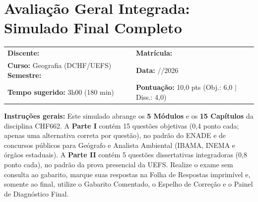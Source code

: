\clearpage
{}
{}
\chapter*{Avaliação Geral Integrada: Simulado Final Completo}

\begin{tcolorbox}[
  breakable, enhanced,
  colback=bgSoft, colframe=uefsNavy,
  borderline west={4pt}{0pt}{uefsGold},
  boxrule=0.8pt, arc=3pt,
  title={\bfseries CABEÇALHO DE SIMULADO PRESENCIAL, CHF662 ANÁLISE AMBIENTAL (DCHF/UEFS)},
  coltitle=white, colbacktitle=uefsNavy,
  left=10pt, right=10pt, top=7pt, bottom=7pt
]
\small
\begin{tabularx}{\textwidth}{@{}X p{4.2cm}@{}}
  \textbf{Discente:} \hrulefill & \textbf{Matrícula:} \hrulefill \\[5pt]
  \textbf{Curso:} Geografia (DCHF/UEFS) \quad\textbf{Semestre:} \underline{\hspace{1.8cm}} & \textbf{Data:} \underline{\hspace{0.9cm}}/\underline{\hspace{0.9cm}}/2026 \\[5pt]
  \textbf{Tempo sugerido:} 3h00 (180 min) & \textbf{Pontuação:} 10,0 pts (Obj.: 6,0 $|$ Diss.: 4,0) \\
\end{tabularx}
\vspace{4pt}

{\footnotesize\color{uefsMuted}\textbf{Instruções gerais:} Este simulado abrange os \textbf{5 Módulos} e os \textbf{15 Capítulos} da disciplina CHF662. A \textbf{Parte I} contém 15 questões objetivas (0,4 ponto cada; apenas uma alternativa correta por questão), no padrão do ENADE e de concursos públicos para Geógrafo e Analista Ambiental (IBAMA, INEMA e órgãos estaduais). A \textbf{Parte II} contém 5 questões dissertativas integradoras (0,8 ponto cada), no padrão da prova presencial da UEFS. Realize o exame sem consulta ao gabarito, marque suas respostas na Folha de Respostas imprimível e, somente ao final, utilize o Gabarito Comentado, o Espelho de Correção e o Painel de Diagnóstico Final.}
\end{tcolorbox}

